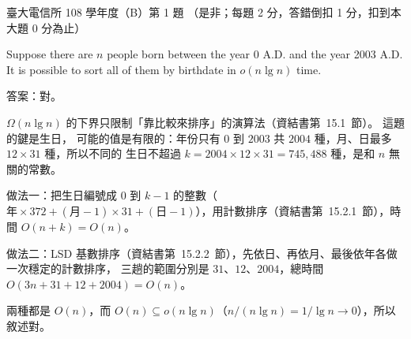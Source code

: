 \begin{pastexam}[label={px:ntu-108-comm-dsab-01}]{臺大電信所 108 學年度（B）第 1 題}
（是非；每題 2 分，答錯倒扣 1 分，扣到本大題 0 分為止）

Suppose there are $n$ people born between the year 0 A.D. and the year 2003 A.D. It is possible
to sort all of them by birthdate in $o(n\lg n)$ time.
\end{pastexam}

\begin{pastsoln}
答案：對。

$\Omega(n \lg n)$ 的下界只限制「靠比較來排序」的演算法（資結書第~15.1~節）。 這題的鍵是生日，
可能的值是有限的：年份只有 $0$ 到 $2003$ 共 $2004$ 種，月、日最多 $12 \times 31$ 種，所以不同的
生日不超過 $k = 2004 \times 12 \times 31 = 745{,}488$ 種，是和 $n$ 無關的常數。

做法一：把生日編號成 $0$ 到 $k - 1$ 的整數（$\text{年} \times 372 + (\text{月} - 1) \times 31 +
(\text{日} - 1)$），用計數排序（資結書第~15.2.1~節），時間 $O(n + k) = O(n)$。

做法二：LSD 基數排序（資結書第~15.2.2~節），先依日、再依月、最後依年各做一次穩定的計數排序，
三趟的範圍分別是 $31$、$12$、$2004$，總時間 $O(3n + 31 + 12 + 2004) = O(n)$。

兩種都是 $O(n)$，而 $O(n) \subseteq o(n \lg n)$（$n / (n \lg n) = 1/\lg n \to 0$），所以敘述對。
\end{pastsoln}
